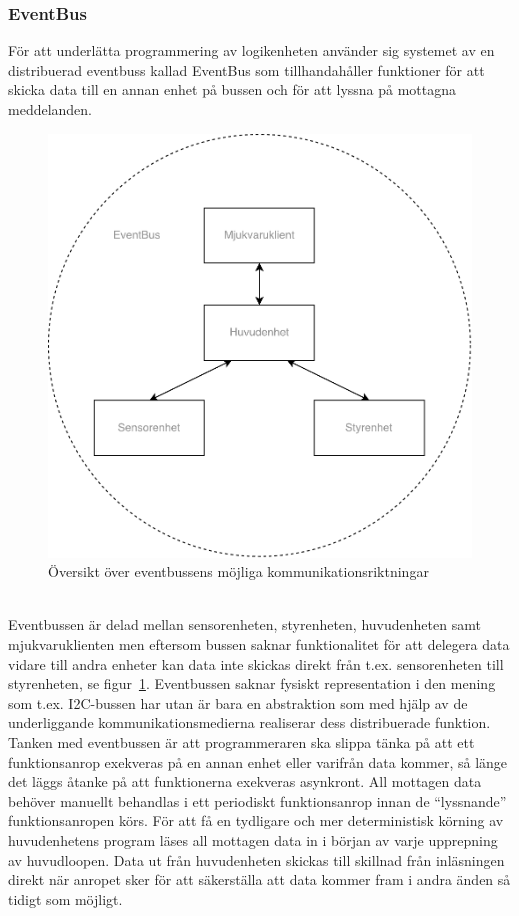 \documentclass{article}
\begin{document}
\subsubsection{EventBus}
\label{sec:eventbus}
För att underlätta programmering av logikenheten använder sig systemet av en distribuerad eventbuss kallad EventBus som tillhandahåller funktioner för att skicka data till en annan enhet på bussen och för att lyssna på mottagna meddelanden.

\begin{figure}[H]
\centering
\includegraphics[scale=0.45]{EventBus}
\caption{Översikt över eventbussens möjliga kommunikationsriktningar}
\label{fig:eventbus_structure}
\end{figure}
\ \\
Eventbussen är delad mellan sensorenheten, styrenheten, huvudenheten samt mjukvaruklienten men eftersom bussen saknar funktionalitet för att delegera data vidare till andra enheter kan data inte skickas direkt från t.ex. sensorenheten till styrenheten, se figur~\ref{fig:eventbus_structure}. Eventbussen saknar fysiskt representation i den mening som t.ex. I2C-bussen har utan är bara en abstraktion som med hjälp av de underliggande kommunikationsmedierna realiserar dess distribuerade funktion.
\newline\newline
Tanken med eventbussen är att programmeraren ska slippa tänka på att ett funktionsanrop exekveras på en annan enhet eller varifrån data kommer, så länge det läggs åtanke på att funktionerna exekveras asynkront. All mottagen data behöver manuellt behandlas i ett periodiskt funktionsanrop innan de ``lyssnande'' funktionsanropen körs. För att få en tydligare och mer deterministisk körning av huvudenhetens program läses all mottagen data in i början av varje upprepning av huvudloopen. Data ut från huvudenheten skickas till skillnad från inläsningen direkt när anropet sker för att säkerställa att data kommer fram i andra änden så tidigt som möjligt.
\end{document}
